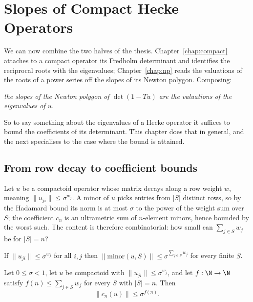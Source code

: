 \chapter{Slopes of Compact Hecke Operators}
\label{chap:slopes}

We can now combine the two halves of the thesis.  Chapter~\ref{chap:compact} attaches to a
compact operator its Fredholm determinant and identifies the reciprocal roots with the
eigenvalues; Chapter~\ref{chap:np} reads the valuations of the roots of a power series off the
slopes of its Newton polygon.  Composing:

\begin{center}
  \emph{the slopes of the Newton polygon of $\det(1 - Tu)$ are the valuations of the eigenvalues
  of $u$.}
\end{center}

So to say something about the eigenvalues of a Hecke operator it suffices to bound the
coefficients of its determinant.  This chapter does that in general, and the next specialises to
the case where the bound is attained.

\section{From row decay to coefficient bounds}

Let $u$ be a compactoid operator whose matrix decays along a row weight $w$, meaning $\lVert
u_{ji} \rVert \leq \sigma^{w_j}$.  A minor of $u$ picks entries from $\lvert S \rvert$ distinct
rows, so by the Hadamard bound its norm is at most $\sigma$ to the power of the weight sum over
$S$; the coefficient $c_n$ is an ultrametric sum of $n$-element minors, hence bounded by the
worst such.  The content is therefore combinatorial: how small can $\sum_{j \in S} w_j$ be for
$\lvert S \rvert = n$?

\begin{lemma}
  \label{lem:minor-bound}
  \leanok
  If $\lVert u_{ji}\rVert \leq \sigma^{w_j}$ for all $i, j$ then $\lVert \mathrm{minor}(u, S)
  \rVert \leq \sigma^{\sum_{j \in S} w_j}$ for every finite $S$.
\end{lemma}

\begin{theorem}
  \label{thm:slope-bound}
  \leanok
  Let $0 \leq \sigma < 1$, let $u$ be compactoid with $\lVert u_{ji}\rVert \leq \sigma^{w_j}$,
  and let $f : \N \to \N$ satisfy $f(n) \leq \sum_{j \in S} w_j$ for every $S$ with $\lvert S
  \rvert = n$.  Then
  \[
    \lVert c_n(u) \rVert \leq \sigma^{f(n)} .
  \]
\end{theorem}

